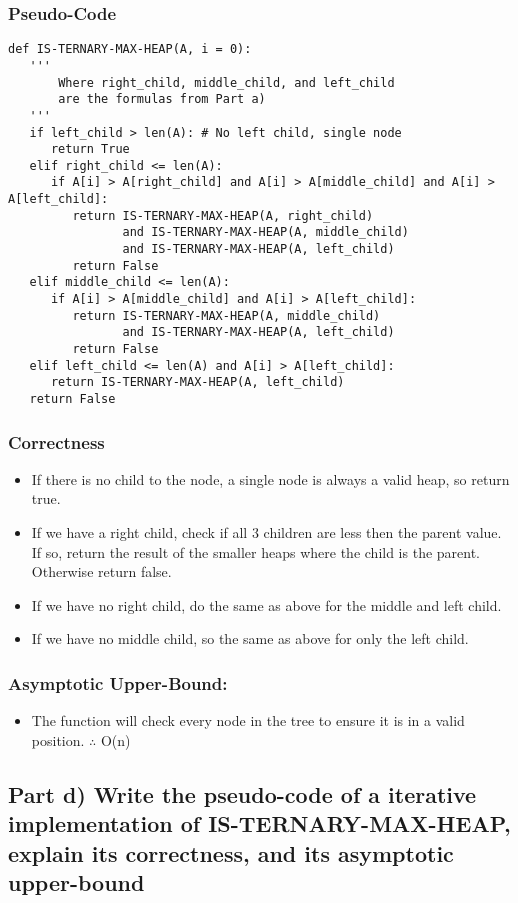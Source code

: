 \documentclass[11pt]{article}
\begin{document}
\subsubsection{Pseudo-Code}
\label{sec-2-3-1}
\begin{verbatim}
def IS-TERNARY-MAX-HEAP(A, i = 0):
   '''
       Where right_child, middle_child, and left_child
       are the formulas from Part a)
   '''
   if left_child > len(A): # No left child, single node
      return True
   elif right_child <= len(A):
      if A[i] > A[right_child] and A[i] > A[middle_child] and A[i] > A[left_child]:
         return IS-TERNARY-MAX-HEAP(A, right_child)
                and IS-TERNARY-MAX-HEAP(A, middle_child)
                and IS-TERNARY-MAX-HEAP(A, left_child)
         return False
   elif middle_child <= len(A):
      if A[i] > A[middle_child] and A[i] > A[left_child]:
         return IS-TERNARY-MAX-HEAP(A, middle_child)
                and IS-TERNARY-MAX-HEAP(A, left_child)
         return False
   elif left_child <= len(A) and A[i] > A[left_child]:
      return IS-TERNARY-MAX-HEAP(A, left_child)
   return False
\end{verbatim}
\subsubsection{Correctness}
\label{sec-2-3-2}
\begin{itemize}
\item If there is no child to the node, a single node is always a valid heap, so return true.
\item If we have a right child, check if all 3 children are less then the parent value. If so, return the result of the smaller heaps where the child is the parent. Otherwise return false.
\item If we have no right child, do the same as above for the middle and left child.
\item If we have no middle child, so the same as above for only the left child.
\end{itemize}
\subsubsection{Asymptotic Upper-Bound:}
\label{sec-2-3-3}
\begin{itemize}
\item The function will check every node in the tree to ensure it is in a valid position. $\therefore$ O(n)
\end{itemize}
\subsection{Part d) Write the pseudo-code of a iterative implementation of IS-TERNARY-MAX-HEAP, explain its correctness, and its asymptotic upper-bound}
\label{sec-2-4}
\end{document}

